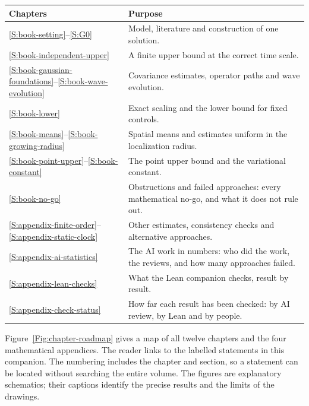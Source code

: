 \documentclass[12pt,oneside,openany]{book}
\numberwithin{equation}{section}
\theoremstyle{nogostyle}
\theoremstyle{definition}
\begin{document}
\begin{center}
\begin{tabular}{@{}p{}p{}@{}}
  \toprule
  Chapters & Purpose \\
  \midrule
  \ref{S:book-setting}--\ref{S:G0} & Model, literature and construction of one solution. \\
  \ref{S:book-independent-upper} & A finite upper bound at the correct time scale. \\
  \ref{S:book-gaussian-foundations}--\ref{S:book-wave-evolution} & Covariance estimates, operator paths and wave evolution. \\
  \ref{S:book-lower} & Exact scaling and the lower bound for fixed controls. \\
  \ref{S:book-means}--\ref{S:book-growing-radius} & Spatial means and estimates uniform in the localization radius. \\
  \ref{S:book-point-upper}--\ref{S:book-constant} & The point upper bound and the variational constant. \\
  \ref{S:book-no-go} & Obstructions and failed approaches: every mathematical no-go, and what it does not rule out. \\
  \midrule
  \ref{S:appendix-finite-order}--\ref{S:appendix-static-clock} & Other estimates, consistency checks and alternative approaches. \\
  \ref{S:appendix-ai-statistics} & The AI work in numbers: who did the work, the reviews, and how many approaches failed. \\
  \ref{S:appendix-lean-checks} & What the Lean companion checks, result by result. \\
  \ref{S:appendix-check-status} & How far each result has been checked: by AI review, by Lean and by people. \\
  \bottomrule
\end{tabular}
\end{center}

Figure~\ref{Fig:chapter-roadmap} gives a map of all twelve chapters and the
four mathematical appendices. The reader links to the labelled statements in this companion. The numbering
includes the chapter and section, so a statement can be located
without searching the entire volume. The figures are explanatory schematics;
their captions identify the precise results and the limits of the drawings.
\end{document}
